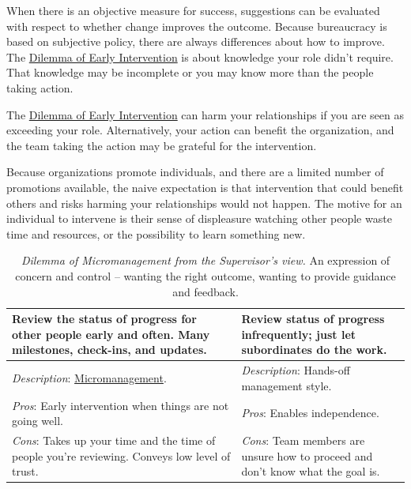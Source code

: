 When there is an objective measure for success, suggestions can be evaluated with respect to whether change improves the outcome. Because bureaucracy is based on subjective policy, there are always differences about how to improve. The \href{table:early-intervention}{Dilemma of Early Intervention} is about knowledge your role didn't require. That knowledge may be incomplete or you may know more than the people taking action. 


The \href{table:early-intervention}{Dilemma of Early Intervention} can harm your relationships if you are seen as exceeding your role. Alternatively, your action can benefit the organization, and the team taking the action may be grateful for the intervention. 

Because organizations promote individuals, and there are a limited number of promotions available, the naive expectation is that intervention that could benefit others and risks harming your relationships would not happen. The motive for an individual to intervene is their sense of displeasure watching other people waste time and resources, or the possibility to learn something new.


\begin{center}
\begin{table}[H] %
\begin{tabular}{ | m{\dilemmatablewidth}| m{\dilemmatablewidth} | } 
  \hline
  \textbf{Review the status of progress for other people early and often. Many milestones, check-ins, and updates.} &
  \textbf{Review status of progress infrequently; just let subordinates do the work.} \\
  \hline
  \textit{Description}: \href{https://en.wikipedia.org/wiki/Micromanagement}{Micromanagement}. 
  \index{Wikipedia!\href{https://en.wikipedia.org/wiki/Micromanagement}{Micromanagement}}
  & 
  \textit{Description}: Hands-off management style. \\
  \hline
  \textit{Pros}: Early intervention when things are not going well. & 
  \textit{Pros}: Enables independence. \\
  \hline
  \textit{Cons}: Takes up your time and the time of people you're reviewing. Conveys low level of trust. & 
  \textit{Cons}: Team members are unsure how to proceed and don't know what the goal is. \\
  \hline
\end{tabular}
\caption{\textit{Dilemma of Micromanagement from the Supervisor's view.}
An expression of concern and control -- wanting the right outcome, wanting to provide guidance and feedback. 
}
\label{table:micromanaging}
\end{table}
\end{center}

